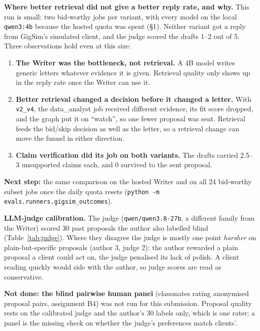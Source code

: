 \documentclass[10pt,a4paper]{article}
\newcommand{\code}[1]{\texttt{\small #1}}
\newcommand{\tbl}[3][]{\begin{table}[h!]\centering\caption{#2}#1\adjustbox{max width=\linewidth}{\small}\par\vspace{1pt}{\scriptsize}\end{table}}
\begin{document}
\textbf{Where better retrieval did not give a better reply rate, and why.} This run is small: two bid-worthy jobs per variant, with every model on the local \code{qwen3:4b} because the hosted quota was spent (\S1). Neither variant got a reply from GigSim's simulated client, and the judge scored the drafts 1--2 out of 5. Three observations hold even at this size:
\begin{enumerate}
\item \textbf{The Writer was the bottleneck, not retrieval.} A 4B model writes generic letters whatever evidence it is given. Retrieval quality only shows up in the reply rate once the Writer can use it.
\item \textbf{Better retrieval changed a decision before it changed a letter.} With \code{v2\_v4}, the data\_analyst job received different evidence, its fit score dropped, and the graph put it on ``watch'', so one fewer proposal was sent. Retrieval feeds the bid/skip decision as well as the letter, so a retrieval change can move the funnel in either direction.
\item \textbf{Claim verification did its job on both variants.} The drafts carried 2.5--3 unsupported claims each, and 0 survived to the sent proposal.
\end{enumerate}
\noindent\textbf{Next step:} the same comparison on the hosted Writer and on all 24 bid-worthy subset jobs once the daily quota resets (\code{python -m evals.runners.gigsim\_outcomes}).

\textbf{LLM-judge calibration.} The judge (\code{qwen/qwen3.8-27b}, a different family from the Writer) scored 30 past proposals the author also labelled blind (Table~\ref{tab:judge}). Where they disagree the judge is mostly one point \emph{harsher} on plain-but-specific proposals (author 3, judge 2): the author rewarded a plain proposal a client could act on, the judge penalised its lack of polish. A client reading quickly would side with the author, so judge scores are read as conservative.

\textbf{Not done: the blind pairwise human panel} (classmates rating anonymised proposal pairs, assignment B4) was not run for this submission. Proposal quality rests on the calibrated judge and the author's 30 labels only, which is one rater; a panel is the missing check on whether the judge's preferences match clients'.
\tbl[\label{tab:judge}]{Judge calibration against 30 human labels.}{judge}

\end{document}
